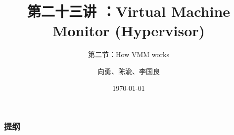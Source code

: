 


\title[第23讲]{第二十三讲 ：Virtual Machine Monitor (Hypervisor)} %
\subtitle{第二节：How VMM works}
\author{向勇、陈渝、李国良} %
\date{\today} %



\begin{frame}
\titlepage %
\end{frame}

%
%
\begin{frame}
\frametitle{提纲} %
\tableofcontents %
\end{frame}
